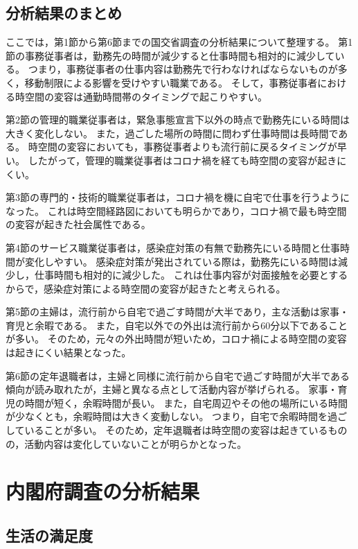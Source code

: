 \documentclass[paper={210mm,297mm},fontsize=15Q,line_length=35zw,number_of_lines=31,head_space=30mm,gutter=40mm,baselineskip=2.0zw,headfoot_verticalposition=1.5zw]{jlreq}
\begin{document}
\subsection{分析結果のまとめ}

ここでは，第1節から第6節までの国交省調査の分析結果について整理する。
第1節の事務従事者は，勤務先の時間が減少すると仕事時間も相対的に減少している。
つまり，事務従事者の仕事内容は勤務先で行わなければならないものが多く，移動制限による影響を受けやすい職業である。
そして，事務従事者における時空間の変容は通勤時間帯のタイミングで起こりやすい。

第2節の管理的職業従事者は，緊急事態宣言下以外の時点で勤務先にいる時間は大きく変化しない。
また，過ごした場所の時間に問わず仕事時間は長時間である。
時空間の変容においても，事務従事者よりも流行前に戻るタイミングが早い。
したがって，管理的職業従事者はコロナ禍を経ても時空間の変容が起きにくい。

第3節の専門的・技術的職業従事者は，コロナ禍を機に自宅で仕事を行うようになった。
これは時空間経路図においても明らかであり，コロナ禍で最も時空間の変容が起きた社会属性である。

第4節のサービス職業従事者は，感染症対策の有無で勤務先にいる時間と仕事時間が変化しやすい。
感染症対策が発出されている際は，勤務先にいる時間は減少し，仕事時間も相対的に減少した。
これは仕事内容が対面接触を必要とするからで，感染症対策による時空間の変容が起きたと考えられる。

第5節の主婦は，流行前から自宅で過ごす時間が大半であり，主な活動は家事・育児と余暇である。
また，自宅以外での外出は流行前から60分以下であることが多い。
そのため，元々の外出時間が短いため，コロナ禍による時空間の変容は起きにくい結果となった。

第6節の定年退職者は，主婦と同様に流行前から自宅で過ごす時間が大半である傾向が読み取れたが，主婦と異なる点として活動内容が挙げられる。
家事・育児の時間が短く，余暇時間が長い。
また，自宅周辺やその他の場所にいる時間が少なくとも，余暇時間は大きく変動しない。
つまり，自宅で余暇時間を過ごしていることが多い。
そのため，定年退職者は時空間の変容は起きているものの，活動内容は変化していないことが明らかとなった。

\section{内閣府調査の分析結果}

\subsection{生活の満足度}
\end{document}
